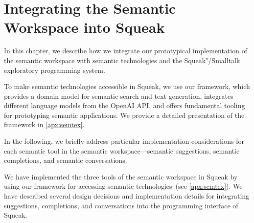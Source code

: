 
\chapter{Integrating the Semantic Workspace into Squeak}
\label{cha:implementation}

In this chapter, we describe how we integrate our prototypical implementation of the semantic workspace with semantic technologies and the Squeak"/Smalltalk exploratory programming system.

To make semantic technologies accessible in Squeak, we use our \semtex framework, which provides a domain model for semantic search and text generation, integrates different language models from the OpenAI API, and offers fundamental tooling for prototyping semantic applications.
We provide a detailed presentation of the framework in \cref{apx:semtex}.

In the following, we briefly address particular implementation considerations for each semantic tool in the semantic workspace---semantic suggestions, semantic completions, and semantic conversations.


\begin{summary}
	We have implemented the three tools of the semantic workspace in Squeak by using our \semtex framework for accessing semantic technologies~(see \cref{apx:semtex}).
	We have described several design decisions and implementation details for integrating suggestions, completions, and conversations into the programming interface of Squeak.
\end{summary}
